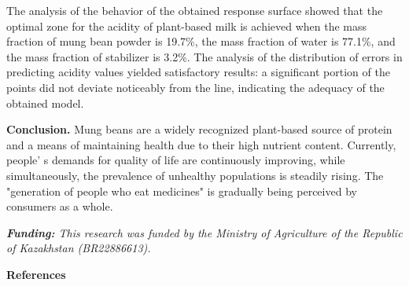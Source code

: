 \begin{multicols}{2}
The analysis of the behavior of the obtained response surface showed
that the optimal zone for the acidity of plant-based milk is achieved
when the mass fraction of mung bean powder is 19.7\%, the mass fraction
of water is 77.1\%, and the mass fraction of stabilizer is 3.2\%. The
analysis of the distribution of errors in predicting acidity values
yielded satisfactory results: a significant portion of the points did
not deviate noticeably from the line, indicating the adequacy of the
obtained model.

{\bfseries Conclusion.} Mung beans are a widely recognized plant-based
source of protein and a means of maintaining health due to their high
nutrient content. Currently, people' s demands for
quality of life are continuously improving, while simultaneously, the
prevalence of unhealthy populations is steadily rising. The "generation
of people who eat medicines" is gradually being perceived by consumers
as a whole.

\emph{{\bfseries Funding:} This research was funded by the Ministry of
Agriculture of the Republic of Kazakhstan (BR22886613).}
\end{multicols}

\begin{center}
{\bfseries References}
\end{center}

